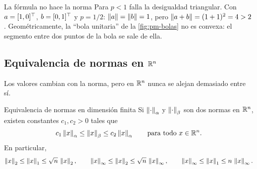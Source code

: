 \begin{trampa}[label=tr:pm-pmenor]{La fórmula no hace la norma}
Para $p<1$ falla la desigualdad triangular. Con $a=[1,0]^{\top}$, $b=[0,1]^{\top}$ y $p=1/2$: $\left\lVert a\right\rVert=\left\lVert b\right\rVert=1$, pero $\left\lVert a+b\right\rVert=(1+1)^2=4>2$. Geométricamente, la ``bola unitaria'' de la \cref{fig:pm-bolas} no es convexa: el segmento entre dos puntos de la bola se sale de ella.
\end{trampa}


\subsection{Equivalencia de normas en \texorpdfstring{$\mathbb{R}^n$}{Rn}}

Los valores cambian con la norma, pero en $\mathbb{R}^n$ nunca se alejan demasiado entre sí.

\begin{teorema}[label=thm:pm-equivalencia]{Equivalencia de normas en dimensión finita}
Si $\left\lVert \cdot\right\rVert_\alpha$ y $\left\lVert \cdot\right\rVert_\beta$ son dos normas en $\mathbb{R}^n$, existen constantes $c_1,c_2>0$ tales que
\[
  c_1\left\lVert x\right\rVert_\alpha\le\left\lVert x\right\rVert_\beta\le c_2\left\lVert x\right\rVert_\alpha\qquad\text{para todo }x\in\mathbb{R}^n .
\]
En particular,
\begin{equation}
  \left\lVert x\right\rVert_2\le\left\lVert x\right\rVert_1\le\sqrt n\,\left\lVert x\right\rVert_2,\qquad
  \left\lVert x\right\rVert_\infty\le\left\lVert x\right\rVert_2\le\sqrt n\,\left\lVert x\right\rVert_\infty,\qquad
  \left\lVert x\right\rVert_\infty\le\left\lVert x\right\rVert_1\le n\,\left\lVert x\right\rVert_\infty .
  \label{eq:pm-equiv}
\end{equation}
\end{teorema}

